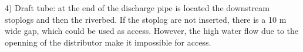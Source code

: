 

4) Draft tube: at the end of the discharge pipe is located the downstream
stoplogs and then the riverbed. If the stoplog are not inserted, there is a 10 m wide gap, which
could be used as access. However, the high water flow due to the
openning of the distributor make it impossible for access. %




